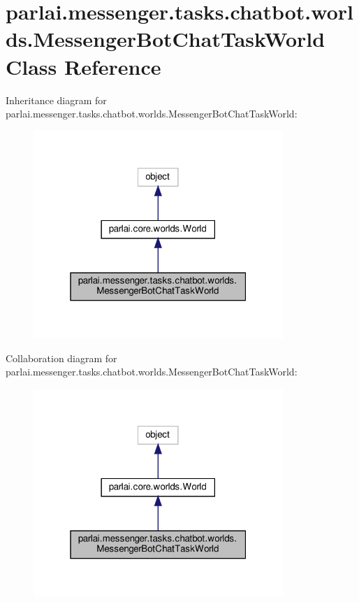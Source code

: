 \hypertarget{classparlai_1_1messenger_1_1tasks_1_1chatbot_1_1worlds_1_1MessengerBotChatTaskWorld}{}\section{parlai.\+messenger.\+tasks.\+chatbot.\+worlds.\+Messenger\+Bot\+Chat\+Task\+World Class Reference}
\label{classparlai_1_1messenger_1_1tasks_1_1chatbot_1_1worlds_1_1MessengerBotChatTaskWorld}


Inheritance diagram for parlai.\+messenger.\+tasks.\+chatbot.\+worlds.\+Messenger\+Bot\+Chat\+Task\+World\+:
\nopagebreak
\begin{figure}[H]
\begin{center}
\leavevmode
\includegraphics[width=268pt]{classparlai_1_1messenger_1_1tasks_1_1chatbot_1_1worlds_1_1MessengerBotChatTaskWorld__inherit__graph}
\end{center}
\end{figure}


Collaboration diagram for parlai.\+messenger.\+tasks.\+chatbot.\+worlds.\+Messenger\+Bot\+Chat\+Task\+World\+:
\nopagebreak
\begin{figure}[H]
\begin{center}
\leavevmode
\includegraphics[width=268pt]{classparlai_1_1messenger_1_1tasks_1_1chatbot_1_1worlds_1_1MessengerBotChatTaskWorld__coll__graph}
\end{center}
\end{figure}
